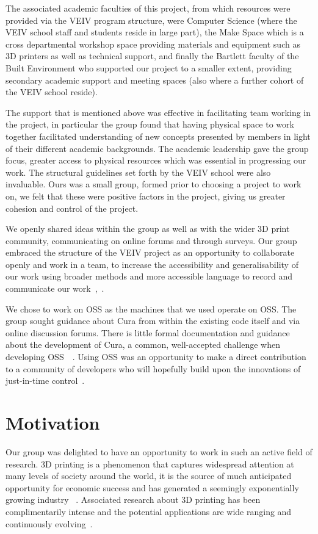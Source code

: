 \documentclass[pdftex, 11pt]{report} %
\begin{document}
The associated academic faculties of this project, from which resources were provided via the VEIV program structure, were Computer Science (where the VEIV school staff and students reside in large part), the Make Space which is a cross departmental workshop space providing materials and equipment such as 3D printers as well as technical support, and finally the Bartlett faculty of the Built Environment who supported our project to a smaller extent, providing secondary academic support and meeting spaces (also where a further cohort of the VEIV school reside).

The support that is mentioned above was effective in facilitating team working in the project, in particular the group found that having physical space to work together facilitated understanding of new concepts presented by members in light of their different academic backgrounds. The academic leadership gave the group focus, greater access to physical resources which was essential in progressing our work. The structural guidelines set forth by the VEIV school were also invaluable. Ours was a small group, formed prior to choosing a project to work on, we felt that these were positive factors in the project, giving us greater cohesion and control of the project. 

We openly shared ideas within the group as well as with the wider 3D print community, communicating on online forums and through surveys. Our group embraced the structure of the VEIV project as an opportunity to collaborate openly and work in a team, to increase the accessibility and generalisability of our work using broader methods and more accessible language to record and communicate our work~\cite{Klein2006},~\cite{Wagner2011}. 

We chose to work on OSS as the machines that we used operate on OSS. The group sought guidance about Cura from within the existing code itself and via online discussion forums. There is little formal documentation and guidance about the development of Cura, a common, well-accepted challenge when developing OSS~\cite{Robert2006}~\cite{Baldwin2006}. Using OSS was an opportunity to make a direct contribution to a community of developers who will hopefully build upon the innovations of just-in-time control~\cite{VonKrogh2006}. 





\section{Motivation}
Our group was delighted to have an opportunity to work in such an active field of research. 3D printing is a phenomenon that captures widespread attention at many levels of society around the world, it is the source of much anticipated opportunity for economic success and has generated a seemingly exponentially growing industry ~\cite{Birtchnell2013}. Associated research about 3D printing has been complimentarily intense and the potential applications are wide ranging and continuously evolving~\cite{Guo2013}. 
\end{document}
